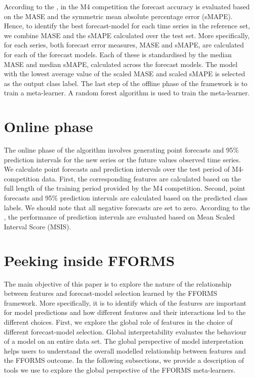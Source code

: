 \documentclass[11pt,a4paper,]{article}
\begin{document}
According to the \textcite{M4compguide}, in the M4 competition the forecast accuracy is evaluated based on the MASE and the symmetric mean absolute percentage error (sMAPE). Hence, to identify the best forecast-model for each time series in the reference set, we combine MASE and the sMAPE calculated over the test set. More specifically, for each series, both forecast error measures, MASE and sMAPE, are calculated for each of the forecast models. Each of these is standardised by the median MASE and median sMAPE, calculated across the forecast models. The model with the lowest average value of the scaled MASE and scaled sMAPE is selected as the output class label. The last step of the offline phase of the framework is to train a meta-learner. A random forest algorithm is used to train the meta-learner.

\hypertarget{online}{%
\section{Online phase}\label{online}}

The online phase of the algorithm involves generating point forecasts and 95\% prediction intervals for the new series or the future values observed time series. We calculate point forecasts and prediction intervals over the test period of M4-competition data. First, the corresponding features are calculated based on the full length of the training period provided by the M4 competition. Second, point forecasts and 95\% prediction intervals are calculated based on the predicted class labels. We should note that all negative forecasts are set to zero. According to the \textcite{M4compguide}, the performance of prediction intervals are evaluated based on Mean Scaled Interval Score (MSIS).

\hypertarget{peeking}{%
\section{Peeking inside FFORMS}\label{peeking}}

The main objective of this paper is to explore the nature of the relationship between features and forecast-model selection learned by the FFORMS framework. More specifically, it is to identify which of the features are important for model predictions and how different features and their interactions led to the different choices. First, we explore the global role of features in the choice of different forecast-model selection. Global interpretability evaluates the behaviour of a model on an entire data set. The global perspective of model interpretation helps users to understand the overall modelled relationship between features and the FFORMS outcome. In the following subsections, we provide a description of tools we use to explore the global perspective of the FFORMS meta-learners.
\end{document}

